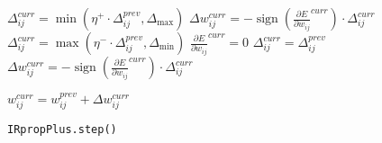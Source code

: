 \begin{algorithm}
    \BlankLine
    \BlankLine

     { \BlankLine
     { \BlankLine \BlankLine
        $\Delta_{ij}^{curr} = \min(\eta^{+} \cdot \Delta_{ij}^{prev}, \Delta_{\max})$ \BlankLine
        $\Delta w_{ij}^{curr} = -\operatorname{sign}(\frac{\partial E}{\partial w_{ij}}^{curr}) \cdot \Delta_{ij}^{curr}$
    }
     { \BlankLine \BlankLine
        $\Delta_{ij}^{curr} = \max(\eta^{-} \cdot \Delta_{ij}^{prev}, \Delta_{\min})$ \BlankLine
        ${\frac{\partial E}{\partial w_{ij}}}^{curr} = 0$
    }
     { \BlankLine \BlankLine
        $\Delta_{ij}^{curr} = \Delta_{ij}^{prev}$ \BlankLine
        $\Delta w_{ij}^{curr} = -\operatorname{sign}(\frac{\partial E}{\partial w_{ij}}^{curr}) \cdot \Delta_{ij}^{curr}$
    } \BlankLine \BlankLine

        $w_{ij}^{curr} = w_{ij}^{prev} + \Delta w_{ij}^{curr}$
    }

    \caption{\texttt{IRpropPlus.step()}}
    \label{alg:irpropplus}
\end{algorithm}